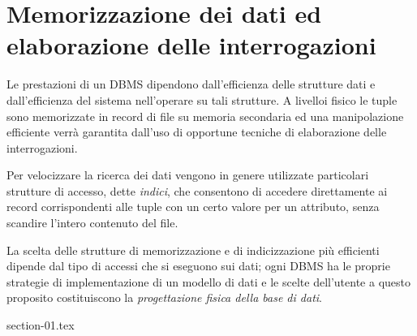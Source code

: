 \chapter{Memorizzazione dei dati ed elaborazione delle interrogazioni}%
\label{cha:Memorizzazione dei dati ed elaborazione delle interrogazioni}
Le prestazioni di un DBMS dipendono dall'efficienza delle strutture dati e
dall'efficienza del sistema nell'operare su tali strutture.
A livelloi fisico le tuple sono memorizzate in record di file su memoria
secondaria ed una manipolazione efficiente verrà garantita dall'uso di opportune
tecniche di elaborazione delle interrogazioni.

Per velocizzare la ricerca dei dati vengono in genere utilizzate particolari
strutture di accesso, dette \emph{indici}, che consentono di accedere
direttamente ai record corrispondenti alle tuple con un certo valore per un
attributo, senza scandire l'intero contenuto del file.

La scelta delle strutture di memorizzazione e di indicizzazione più efficienti
dipende dal tipo di accessi che si eseguono sui dati; ogni DBMS ha le proprie
strategie di implementazione di un modello di dati e le scelte dell'utente a
questo proposito costituiscono la \emph{progettazione fisica della base di
dati}.

{section-01.tex}
